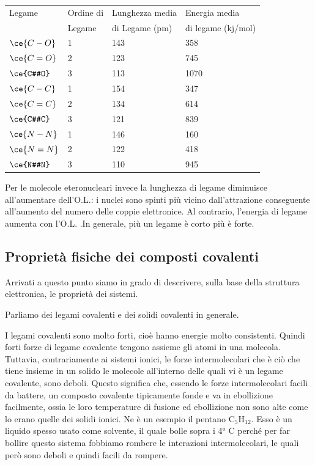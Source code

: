 \begin{center}
    \begin{tabular}{m{2.7cm}m{2.3cm}m{3cm}m{2.7cm}}
        Legame & \hspace{-0.6cm}Ordine di & \hspace{-1cm}Lunghezza media & \hspace{-0.6cm}Energia media\\
        & \vspace{-0.3cm}\hspace{-0.5cm}Legame & \hspace{-0.9cm}di Legame (pm) & \hspace{-1cm}di legame (kj/mol)\\[0.2ex] 
        \hline
        $\ce{C-O}$ & 1 & 143 & 358\\
        $\ce{C=O}$ & 2 & 123 & 745\\
        $\ce{C#O}$ & 3 & 113 & \hspace{-0.1cm}1070\\
        $\ce{C-C}$ & 1 & 154 & 347\\
        $\ce{C=C}$ & 2 & 134 & 614\\
        $\ce{C#C}$ & 3 & 121 & 839\\
        $\ce{N-N}$ & 1 & 146 & 160\\
        $\ce{N=N}$ & 2 & 122 & 418\\
        $\ce{N#N}$ & 3 & 110 & 945
    \end{tabular}
\end{center}

Per le molecole eteronucleari invece la lunghezza di legame diminuisce all'aumentare dell'O.L.: i nuclei sono spinti più vicino dall'attrazione conseguente all'aumento del numero delle coppie elettronice. Al contrario, l'energia di legame aumenta con l'O.L. .In generale, più un legame è corto più è forte.

\subsection{Proprietà fisiche dei composti covalenti}
Arrivati a questo punto siamo in grado di descrivere, sulla base della struttura elettronica, le proprietà dei sistemi.

Parliamo dei legami covalenti e dei solidi covalenti in generale. 

I legami covalenti sono molto forti, cioè hanno energie molto consistenti. Quindi forti forze di legame covalente tengono assieme gli atomi in una molecola. Tuttavia, contrariamente ai sistemi ionici, le forze intermolecolari che è ciò che tiene insieme in un solido le molecole all'interno delle quali vi è un legame covalente, sono deboli. Questo significa che, essendo le forze intermolecolari facili da battere, un composto covalente tipicamente fonde e va in ebollizione facilmente, ossia le loro temperature di fusione ed ebollizione non sono alte come lo erano quelle dei solidi ionici. Ne è un esempio il pentano C$_5$H$_12$. Esso è un liquido spesso usato come solvente, il quale bolle sopra i 4° C perché per far bollire questo sistema fobbiamo rombere le interazioni intermolecolari, le quali però sono deboli e quindi facili da rompere.

